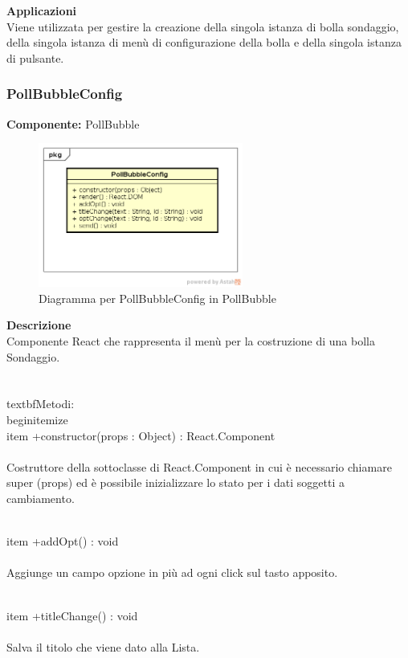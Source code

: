 \textbf{Applicazioni}\\
Viene utilizzata per gestire la creazione della singola istanza di bolla sondaggio, della singola istanza di menù di configurazione della bolla e della singola istanza di pulsante. 


\clearpage

\subsubsection{PollBubbleConfig}
\textbf{Componente:}  PollBubble\\
   \FloatBarrier
   \begin{figure}[ht]
   \centering
   \includegraphics[width=0.6\textwidth]{img/single-PollBubbleConfig}
   \caption{{Diagramma per PollBubbleConfig in PollBubble}}
\end{figure}
\FloatBarrier
\textbf{Descrizione}\\
Componente React che rappresenta il menù per la costruzione di una bolla Sondaggio.
\\\\
\\textbf{Metodi:} 
\\begin{itemize}
\\item +constructor(props : Object) : React.Component 
\\\\
Costruttore della sottoclasse di React.Component in cui è necessario chiamare super (props) ed è possibile inizializzare lo stato per i dati soggetti a cambiamento.

\\item +addOpt() : void 
\\\\
Aggiunge un campo opzione in più ad ogni click sul tasto apposito.

\\item +titleChange() : void 
\\\\
Salva il titolo che viene dato alla Lista.

